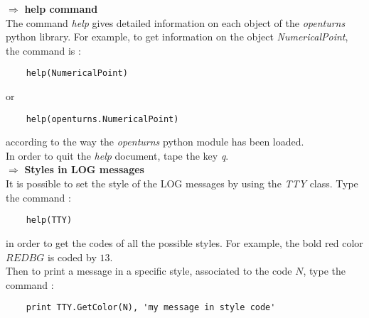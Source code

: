 \renewcommand{\filename}{docUC_Intro_GeneralCommands}
\renewcommand{\filetitle}{Some useful general commands}

\HeaderNNIILevel

$\boldsymbol{\Longrightarrow}$ {\bf help command}\\

The command {\itshape help} gives detailed information on each  object of the {\itshape openturns} python library. For example, to get information on the object {\itshape NumericalPoint}, the command is :
\begin{center}
  \begin{lstlisting}
    help(NumericalPoint)
  \end{lstlisting}
\end{center}
or
\begin{center}
  \begin{lstlisting}
    help(openturns.NumericalPoint)
  \end{lstlisting}
\end{center}
according to the way the  {\itshape openturns} python module has been loaded.\\
In order to quit the \emph{help} document, tape the key {\itshape q}.\\

$\boldsymbol{\Longrightarrow}$ {\bf Styles in LOG messages}\\

It is possible to set the style of the LOG messages by using the \emph{TTY} class. Type the command :
\begin{center}
  \begin{lstlisting}
    help(TTY)
  \end{lstlisting}
\end{center}
in order to get the codes of all the possible styles. For example, the bold red color $REDBG$ is coded by $13$.\\
Then to print a message in a specific style, associated to the code $N$, type the command :
\begin{center}
  \begin{lstlisting}
    print TTY.GetColor(N), 'my message in style code'
  \end{lstlisting}
\end{center}

